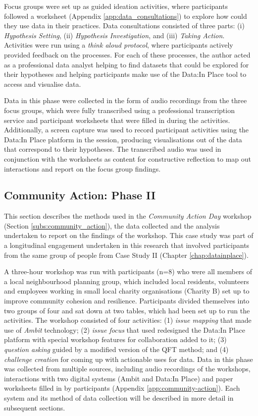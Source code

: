Focus groups were set up as guided ideation activities, where participants followed a worksheet (Appendix \ref{app:data_consultations}) to explore how could they use data in their practices. Data consultations consisted of three parts: (i) \textit{Hypothesis Setting}, (ii) \textit{Hypothesis Investigation}, and (iii) \textit{Taking Action}. Activities were run using a \textit{think aloud protocol}, where participants actively provided feedback on the processes. For each of these processes, the author acted as a professional data analyst helping to find datasets that could be explored for their hypotheses and helping participants make use of the Data:In Place tool to access and visualise data.

Data in this phase were collected in the form of audio recordings from the three focus groups, which were fully transcribed using a professional transcription service and participant worksheets that were filled in during the activities. Additionally, a screen capture was used to record participant activities using the Data:In Place platform in the session, producing visualisations out of the data that correspond to their hypotheses. The transcribed audio was used in conjunction with the worksheets as content for constructive reflection to map out interactions and report on the focus group findings.

\subsection[Community Action]{Community Action: Phase II}
This section describes the methods used in the \textit{Community Action Day} workshop (Section \ref{subs:community_action}), the data collected and the analysis undertaken to report on the findings of the workshop. This case study was part of a longitudinal engagement undertaken in this research that involved participants from the same group of people from Case Study II (Chapter \ref{chap:datainplace}).

A three-hour workshop was run with participants (n=8) who were all members of a local neighbourhood planning group, which included local residents, volunteers and employees working in small local charity organisations (Charity B) set up to improve community cohesion and resilience. Participants divided themselves into two groups of four and sat down at two tables, which had been set up to run the activities. The workshop consisted of four activities: (1) \textit{issue mapping} that made use of \textit{Ambit} \citep{johnson_creating_2020} technology; (2) \textit{issue focus} that used redesigned the Data:In Place platform with special workshop features for collaboration added to it; (3) \textit{question asking} guided by a modified version of the QFT method; and (4) \textit{challenge creation} for coming up with actionable uses for data. Data in this phase was collected from multiple sources, including audio recordings of the workshops, interactions with two digital systems (Ambit and Data:In Place) and paper worksheets filled in by participants (Appendix \ref{app:community-action}). Each system and its method of data collection will be described in more detail in subsequent sections.

